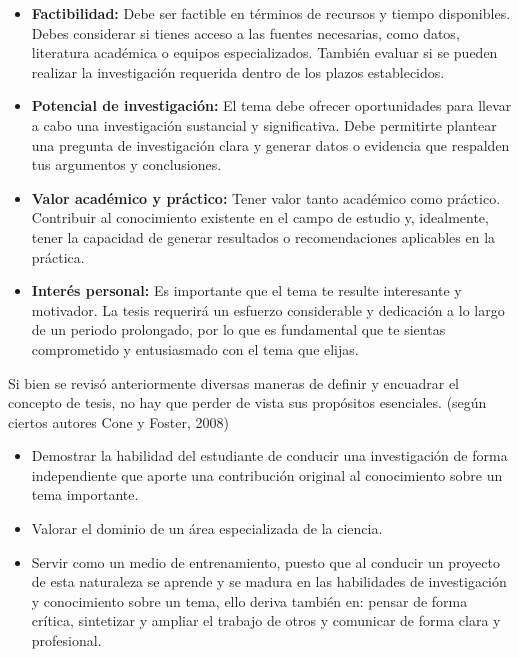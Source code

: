 \documentclass[
	11pt, %
]{beamer}
\begin{document}
\begin{frame}
  \begin{itemize}
  \item \textbf{Factibilidad:} Debe ser factible en términos de recursos y tiempo disponibles. Debes considerar si tienes acceso a las fuentes necesarias, como datos, literatura académica o equipos especializados. También evaluar si se pueden realizar la investigación requerida dentro de los plazos establecidos.
  \item \textbf{Potencial de investigación:} El tema debe ofrecer oportunidades para llevar a cabo una investigación sustancial y significativa. Debe permitirte plantear una pregunta de investigación clara y generar datos o evidencia que respalden tus argumentos y conclusiones.
  \end{itemize}
\end{frame}

\begin{frame}
  \begin{itemize}
  \item \textbf{Valor académico y práctico:} Tener valor tanto académico como práctico. Contribuir al conocimiento existente en el campo de estudio y, idealmente, tener la capacidad de generar resultados o recomendaciones aplicables en la práctica.
  \item \textbf{Interés personal:} Es importante que el tema te resulte interesante y motivador. La tesis requerirá un esfuerzo considerable y dedicación a lo largo de un periodo prolongado, por lo que es fundamental que te sientas comprometido y entusiasmado con el tema que elijas.
  \end{itemize}
\end{frame}

\begin{frame}

  Si bien se revisó anteriormente diversas maneras de definir y encuadrar el concepto de tesis, no hay que perder de vista sus propósitos esenciales. (según ciertos autores Cone y Foster, 2008)\\

  \begin{itemize}
  \item Demostrar la habilidad del estudiante de conducir una investigación de forma independiente que aporte una contribución original al conocimiento sobre un tema importante.
  \item Valorar el dominio de un área especializada de la ciencia.
  \item Servir como un medio de entrenamiento, puesto que al conducir un proyecto de esta naturaleza se aprende y se madura en las habilidades de investigación y conocimiento sobre un tema, ello deriva también en: pensar de forma crítica, sintetizar y ampliar el trabajo de otros y comunicar de forma clara y profesional.
  \end{itemize}
  
\end{frame}
\end{document}
